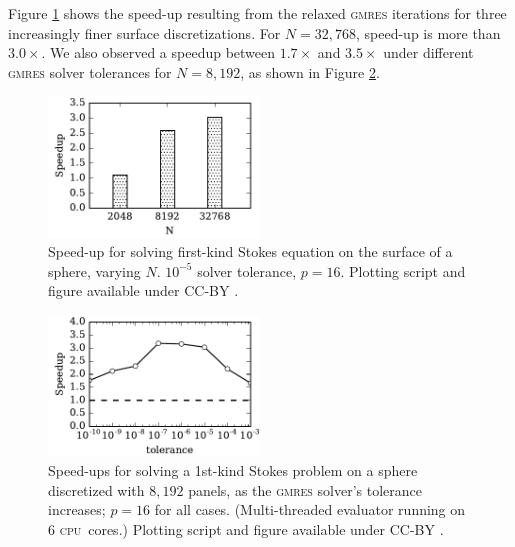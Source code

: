 \documentclass[final,3p,times]{elsarticle}
\newcommand{\cpu}{\textsc{cpu}}
\newcommand{\gmres}{\textsc{gmres}\xspace}
\begin{document}

Figure \ref{fig:stokes_speedup} shows the speed-up resulting from the relaxed \gmres iterations for three increasingly finer surface discretizations. For $N=32,768$, speed-up is more than $3.0\times$. We also observed a speedup between $1.7\times$ and $3.5\times$ under different \gmres solver tolerances for $N=8,192$, as shown in Figure \ref{fig:stokes_tolerance_speedup}.


\begin{figure}%
\begin{center}
	\includegraphics[natwidth=3in,natheight=2in,width=0.5\textwidth]{StokesSpeedupRelaxation.pdf}
	\caption{Speed-up for solving first-kind Stokes equation on the surface of a sphere, varying $N$. $10^{-5}$ solver tolerance, $p=16$. Plotting script and figure available under CC-BY \cite{WangLaytonBarba2016-figshare3}.}
	\label{fig:stokes_speedup}
\end{center}
\end{figure}

\begin{figure}%
	\centering
	\includegraphics[natwidth=3in,natheight=2in,width=0.5\textwidth]{StokesSpeedupTolerance.pdf}
	\caption{Speed-ups for solving a 1st-kind Stokes problem on a sphere discretized with $8,192$ panels, as the \gmres solver's tolerance increases; $p=16$ for all cases. (Multi-threaded evaluator running on 6 \cpu\ cores.) Plotting script and figure available under CC-BY \cite{WangLaytonBarba2016-figshare3}.}
	\label{fig:stokes_tolerance_speedup}
\end{figure}
\end{document}
